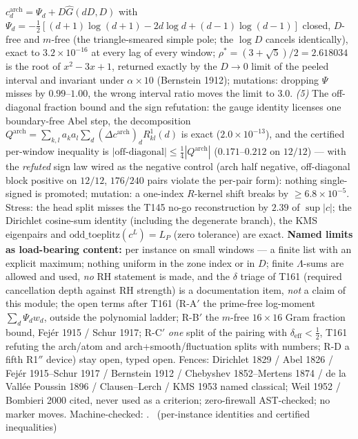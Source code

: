 $c^{\mathrm{arch}}_d=\Psi_d+D\widehat G(dD,D)$ with
$\Psi_d=-\tfrac12[(d{+}1)\log(d{+}1)-2d\log d+(d{-}1)\log(d{-}1)]$
closed, $D$-free and $m$-free (the triangle-smeared simple pole; the
$\log D$ cancels identically), exact to $3.2\times10^{-16}$ at every
lag of every window; $\rho^*=(3+\sqrt5)/2=2.618034$ is the root of
$x^2-3x+1$, returned exactly by the $D\to0$ limit of the peeled
interval and invariant under $\alpha\times10$ (Bernstein 1912);
mutations: dropping $\Psi$ misses by $0.99$--$1.00$, the wrong interval
ratio moves the limit to $3.0$. \emph{(5)} The off-diagonal fraction
bound and the sign refutation: the gauge identity licenses one
boundary-free Abel step, the decomposition
$Q^{\mathrm{arch}}=\sum_{k,l}a_ka_l\sum_d(\Delta c^{\mathrm{arch}})_d
R^1_{kl}(d)$ is exact ($2.0\times10^{-13}$), and the certified
per-window inequality is $|\text{off-diagonal}|\le\tfrac14
|Q^{\mathrm{arch}}|$ ($0.171$--$0.212$ on $12/12$) --- with the
\emph{refuted} sign law wired as the negative control (arch half
negative, off-diagonal block positive on $12/12$, $176/240$ pairs
violate the per-pair form): nothing single-signed is promoted;
mutation: a one-index $R$-kernel shift breaks by
$\ge6.8\times10^{-5}$. Stress: the head split misses the T145 no-go
reconstruction by $2.39$ of $\sup|c|$; the Dirichlet cosine-sum
identity (including the degenerate branch), the KMS eigenpairs and
$\mathrm{odd\_toeplitz}(c^L)=L_P$ (zero tolerance) are exact.
\textbf{Named limits as load-bearing content:} per instance on small
windows --- a finite list with an explicit maximum; nothing uniform in
the zone index or in $D$; finite $\Lambda$-sums are allowed and used,
\emph{no} RH statement is made, and the $\delta$ triage of T161
(required cancellation depth against RH strength) is a documentation
item, \emph{not} a claim of this module; the open terms after T161
(R-A$'$ the prime-free log-moment $\sum_d\Psi_dw_d$, outside the
polynomial ladder; R-B$'$ the $m$-free $16\times16$ Gram fraction
bound, Fej\'er 1915 / Schur 1917; R-C$'$ \emph{one} split of the
pairing with $\delta_{\mathrm{eff}}<\tfrac12$, T161 refuting the
arch/atom and arch+smooth/fluctuation splits with numbers; R-D a fifth
R1$''$ device) stay open, typed open. Fences: Dirichlet 1829 / Abel
1826 / Fej\'er 1915--Schur 1917 / Bernstein 1912 / Chebyshev
1852--Mertens 1874 / de la Vall\'ee Poussin 1896 / Clausen--Lerch / KMS
1953 named classical; Weil 1952 / Bombieri 2000 cited, never used as a
criterion; zero-firewall AST-checked; no marker moves.
Machine-checked: .
\mE\ (per-instance identities and certified inequalities)


